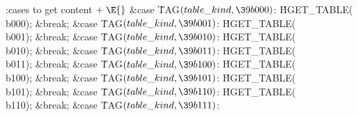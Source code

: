 
\getcode
\Y\B\4:cases to get content\X${}\mathrel+\E{}$\6
\4\&{case} \.{TAG}${}(\index{table kind+\\{table\_kind}}\\{table\_kind},\39\\{b000}){}$:\5
\.{HGET\_TABLE}(\\{b000});\5
\&{break};\6
\4\&{case} \.{TAG}${}(\index{table kind+\\{table\_kind}}\\{table\_kind},\39\\{b001}){}$:\5
\.{HGET\_TABLE}(\\{b001});\5
\&{break};\6
\4\&{case} \.{TAG}${}(\index{table kind+\\{table\_kind}}\\{table\_kind},\39\\{b010}){}$:\5
\.{HGET\_TABLE}(\\{b010});\5
\&{break};\6
\4\&{case} \.{TAG}${}(\index{table kind+\\{table\_kind}}\\{table\_kind},\39\\{b011}){}$:\5
\.{HGET\_TABLE}(\\{b011});\5
\&{break};\6
\4\&{case} \.{TAG}${}(\index{table kind+\\{table\_kind}}\\{table\_kind},\39\\{b100}){}$:\5
\.{HGET\_TABLE}(\\{b100});\5
\&{break};\6
\4\&{case} \.{TAG}${}(\index{table kind+\\{table\_kind}}\\{table\_kind},\39\\{b101}){}$:\5
\.{HGET\_TABLE}(\\{b101});\5
\&{break};\6
\4\&{case} \.{TAG}${}(\index{table kind+\\{table\_kind}}\\{table\_kind},\39\\{b110}){}$:\5
\.{HGET\_TABLE}(\\{b110});\5
\&{break};\6
\4\&{case} \.{TAG}${}(\index{table kind+\\{table\_kind}}\\{table\_kind},\39\\{b111}){}$:\5
